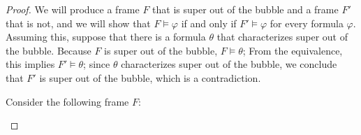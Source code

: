 \documentclass{amsart}
\begin{document}
\begin{proof}
    We will produce a frame $F$ that is super out of the bubble and a frame $F'$ that is not, and we will show that $F \vDash \varphi$ if and only if $F' \vDash \varphi$ for every formula $\varphi$. Assuming this, suppose that there is a formula $\theta$ that characterizes super out of the bubble. Because $F$ is super out of the bubble, $F \vDash \theta$; From the equivalence, this implies $F' \vDash \theta$; since $\theta$ characterizes super out of the bubble, we conclude that $F'$ is super out of the bubble, which is a contradiction.

    Consider the following frame $F$:
    \begin{center}
        \begin{tikzpicture}[x=0.75pt,y=0.75pt,yscale=-.8,xscale=.8]
        

\end{tikzpicture}
\end{center}
\end{proof}
\end{document}
